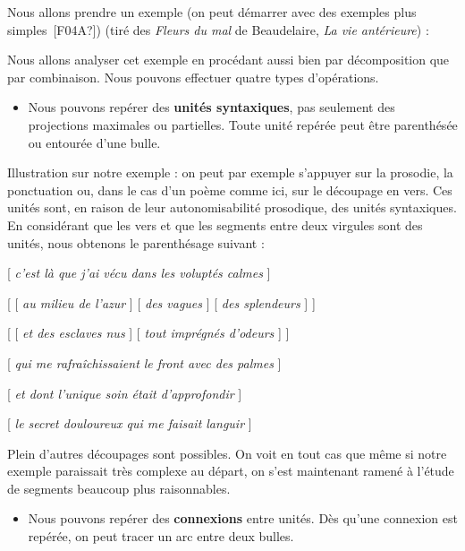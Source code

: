 Nous allons prendre un exemple (on peut démarrer avec des exemples plus simples~[F04A?]) (tiré des \textit{Fleurs du mal} de Beaudelaire, \textit{La vie antérieure}) :

\z
{}
\z
{}
\z
{}
\z
{}
\z
{}
\z

Nous allons analyser cet exemple en procédant aussi bien par décomposition que par combinaison. Nous pouvons effectuer quatre types d’opérations.

\begin{itemize}
\item \begin{styleLivreImportant}
Nous pouvons repérer des \textbf{unités syntaxiques}, pas seulement des projections maximales ou partielles. Toute unité repérée peut être parenthésée ou entourée d’une bulle.
\end{styleLivreImportant}
\end{itemize}

Illustration sur notre exemple : on peut par exemple s’appuyer sur la prosodie, la ponctuation ou, dans le cas d’un poème comme ici, sur le découpage en vers. Ces unités sont, en raison de leur autonomisabilité prosodique, des unités syntaxiques. En considérant que les vers et que les segments entre deux virgules sont des unités, nous obtenons le parenthésage suivant :

\ea{}
[ \textit{c’est là que j’ai vécu dans les voluptés calmes} ]

[ [ \textit{au milieu de l’azur} ] [ \textit{des vagues} ] [ \textit{des splendeurs} ] ]

[ [ \textit{et des esclaves nus} ] [ \textit{tout imprégnés d’odeurs} ] ]

[ \textit{qui me rafraîchissaient le front avec des palmes} ]

[ \textit{et dont l’unique soin était d’approfondir} ]

[ \textit{le secret douloureux qui me faisait languir} ]
\z

Plein d’autres découpages sont possibles. On voit en tout cas que même si notre exemple paraissait très complexe au départ, on s’est maintenant ramené à l’étude de segments beaucoup plus raisonnables.

\begin{itemize}
\item \begin{styleLivreImportant}
Nous pouvons repérer des \textbf{connexions} entre unités. Dès qu’une connexion est repérée, on peut tracer un arc entre deux bulles.
\end{styleLivreImportant}
\end{itemize}

